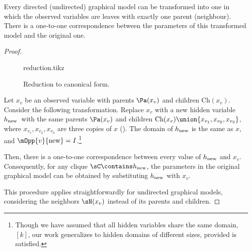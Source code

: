 \begin{lemma}
  \label{lem:reduction}
Every directed (undirected) graphical model can be transformed into one in which
  the observed variables are leaves with exactly one parent (neighbour). 
There is a one-to-one correspondence between the parameters of this
  transformed model and the original one.
\end{lemma}
\begin{proof}
  \begin{figure}
    \centering
    {reduction.tikz}
    \caption{Reduction to canonical form.}
    \label{fig:reduction}
  \end{figure}

  \providecommand{\hp}{\ensuremath{h_\text{\rm new}}}

  Let $x_v$ be an observed variable with parents $\Pa(x_v)$ and children $\text{Ch}(x_v)$.
  Consider the following transformation.
  Replace $x_v$ with a new hidden variable \hp\ with the same
  parents $\Pa(x_v)$ and children $\text{Ch}(x_v) \union \{x_{v_1}, x_{v_2}, x_{v_3}\}$,
  where $x_{v_1},x_{v_2},x_{v_3}$ are three copies of $x$
  (). 
  The domain of $\hp$ is the same as $x$,
    and $\mOpp{v}{\textrm{new}} = I$.\footnote{
      Though we have assumed that all hidden variables share the
      same domain, $[k]$, our work generalizes to hidden domains of
      different sizes, provided  is satisfied.
      }

  Then, there is a one-to-one correspondence between every value of
  $\hp$ and $x_v$. Consequently, for any clique $\sC \contains \hp$, the
  parameters in the original graphical model can be obtained by
  substituting $\hp$ with $x_v$.

  This procedure applies straightforwardly for undirected graphical
  models, considering the neighbors $\sN(x_v)$ instead of its parents
  and children.
\end{proof}


